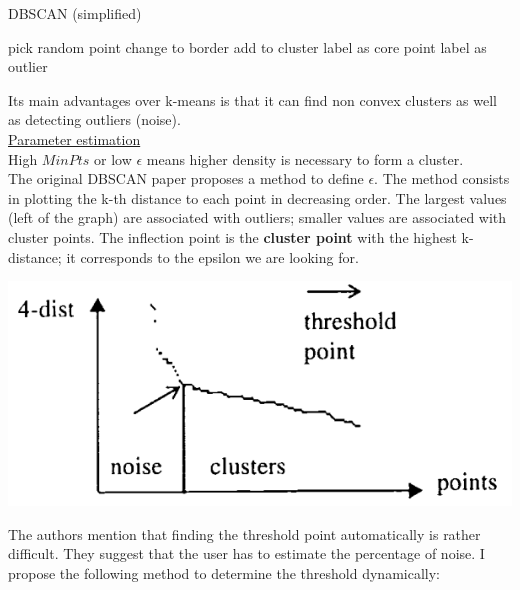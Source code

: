 \begin{algorithm}
\caption{DBSCAN (simplified)}
\begin{algorithmic}
\State pick random point
\State change to border
\EndIf 
\State add to cluster
\EndFor
\Else
{}
\State label as core point
\Else
\State label as outlier
\EndIf
\EndIf 
\EndWhile
\end{algorithmic}
\end{algorithm}

Its main advantages over k-means is that it can find non convex clusters as well as detecting outliers (noise). \\

\underline{Parameter estimation} \\

High $MinPts$ or low $\epsilon$ means higher density is necessary to form a cluster. \\

The original DBSCAN paper proposes a method to define $\epsilon$. The method consists in plotting the k-th distance to each point in decreasing order. The largest values (left of the graph) are associated with outliers; smaller values are associated with cluster points. The inflection point is the \textbf{cluster point} with the highest k-distance; it corresponds to the epsilon we are looking for.

\begin{center}
\includegraphics[scale=0.4]{DBSCAN_epsilon.png}
\end{center}

The authors mention that finding the threshold point automatically is rather difficult. They suggest that the user has to estimate the percentage of noise.
I propose the following method to determine the threshold dynamically:

